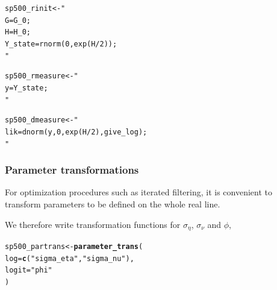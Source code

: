 \documentclass{beamer}\usepackage[]{graphicx}\usepackage[]{color}
\makeatletter
\newcommand{\hlstr}[1]{\textcolor[rgb]{0.192,0.494,0.8}{#1}}%
\newcommand{\hlstd}[1]{\textcolor[rgb]{0.345,0.345,0.345}{#1}}%
\newcommand{\hlkwb}[1]{\textcolor[rgb]{0.69,0.353,0.396}{#1}}%
\newcommand{\hlkwc}[1]{\textcolor[rgb]{0.333,0.667,0.333}{#1}}%
\newcommand{\hlkwd}[1]{\textcolor[rgb]{0.737,0.353,0.396}{\textbf{#1}}}%
\newenvironment{kframe}{%
 \def\at@end@of@kframe{}%
 \ifinner\ifhmode%
  \def\at@end@of@kframe{\end{minipage}}%
  \begin{minipage}{\columnwidth}%
 \fi\fi%
 \def\FrameCommand##1{\hskip\@totalleftmargin \hskip-\fboxsep
 \colorbox{shadecolor}{##1}\hskip-\fboxsep
     \hskip-\linewidth \hskip-\@totalleftmargin \hskip\columnwidth}%
 \MakeFramed {\advance\hsize-\width
   \@totalleftmargin\z@ \linewidth\hsize
   \@setminipage}}%
 {\par\unskip\endMakeFramed%
 \at@end@of@kframe}
\newenvironment{knitrout}{}{} %
\makeatother
\begin{document}
\begin{frame}[fragile]

\begin{knitrout}\small
{}\color{fgcolor}\begin{kframe}
\begin{alltt}
\hlstd{sp500_rinit} \hlkwb{<-} \hlstr{"
  G = G_0;
  H = H_0;
  Y_state = rnorm( 0,exp(H/2) );
"}
\end{alltt}
\end{kframe}
\end{knitrout}

\begin{knitrout}\small
{}\color{fgcolor}\begin{kframe}
\begin{alltt}
\hlstd{sp500_rmeasure} \hlkwb{<-} \hlstr{"
   y=Y_state;
"}

\hlstd{sp500_dmeasure} \hlkwb{<-} \hlstr{"
   lik=dnorm(y,0,exp(H/2),give_log);
"}
\end{alltt}
\end{kframe}
\end{knitrout}


\end{frame}

\begin{frame}[fragile]

\frametitle{Parameter transformations}

\bi

\item For optimization procedures such as iterated filtering, it is convenient to transform parameters to be defined on the whole real line. 

\item We therefore write transformation functions for $\sigma_\eta$, $\sigma_\nu$ and $\phi$,

\ei

\begin{knitrout}\small
{}\color{fgcolor}\begin{kframe}
\begin{alltt}
\hlstd{sp500_partrans} \hlkwb{<-} \hlkwd{parameter_trans}\hlstd{(}
  \hlkwc{log}\hlstd{=}\hlkwd{c}\hlstd{(}\hlstr{"sigma_eta"}\hlstd{,}\hlstr{"sigma_nu"}\hlstd{),}
  \hlkwc{logit}\hlstd{=}\hlstr{"phi"}
\hlstd{)}
\end{alltt}
\end{kframe}
\end{knitrout}

\end{frame}
\end{document}
